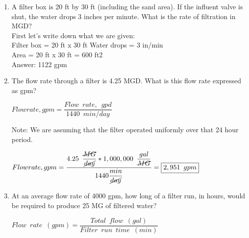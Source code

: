 \documentclass{article}
\begin{document}
\begin{enumerate}
\item A filter box is 20 ft by 30 ft (including the sand area). If the influent valve is shut, the water drops 3 inches per minute. What is the rate of filtration in MGD?\\

First let's write down what we are given:\\

 

Filter box = 20 ft x 30 ft Water drops = 3 in/min\\

Area = 20 ft x 30 ft = 600 ft2\\

Answer:  1122 gpm\\

 

 

\item The flow rate through a filter is 4.25 MGD. What is this flow rate expressed as gpm?\\

\vspace{0.2cm}

$Flow rate, gpm=\dfrac{Flow \enspace rate, \enspace gpd}{1440 \enspace min/day}$\\

\vspace{0.2cm}

Note:  We are assuming that the filter operated uniformly over that 24 hour period.\\

\vspace{0.3cm}

$Flow rate, gpm=\dfrac{4.25 \enspace \dfrac{\cancel{MG}}{\cancel{day}} *1,000,000 \enspace \dfrac{gal}{\cancel{MG}}}{1440\dfrac{min}{\cancel{day}}}=\boxed{2,951 \enspace gpm}$

 

\vspace{0.3cm}

\item At an average flow rate of 4000 gpm, how long of a filter run, in hours, would be required to produce 25 MG of filtered water?\\

\vspace{0.2cm}

$Flow \enspace rate \enspace (gpm)=\dfrac{Total \enspace flow \enspace (gal)}{Filter \enspace run \enspace time \enspace (min)}$


\end{enumerate}
\end{document}
